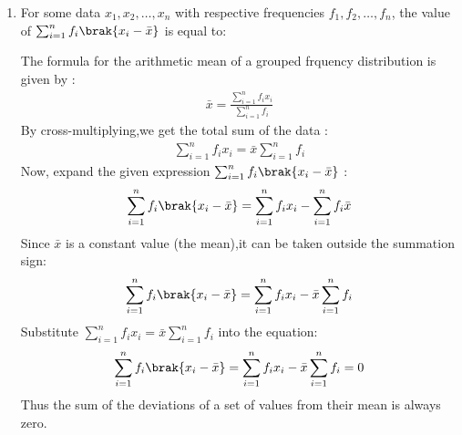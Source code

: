 \begin{enumerate}[label=\thesubsection.\arabic*, ref=\thesubsection.\theenumi]
\item
For some data $x_1, x_2, \ldots, x_n$ with respective frequencies
$f_1, f_2, \ldots, f_n$, the value of $\sum_{i=1}^{n} f_i \brak{x_i - \bar{x}}$ is equal to:
\begin{enumerate}
\end{enumerate}
 \solution
 The formula for the arithmetic mean of a grouped frquency distribution is given by :
 \begin{align} \bar{x} = \frac{ \sum_{i=1}^{n} f_ix_i }{ \sum_{i=1}^{n} f_i }
 \end{align}
 By cross-multiplying,we get the total sum of the data :
 \begin{align} \sum_{i=1}^{n} f_ix_i = \bar{x}\sum_{i=1}^{n} f_i 
 \end{align}
 Now, expand the given expression $\sum_{i=1}^{n} f_i \brak{x_i - \bar{x}}$ :
 \begin{align}\sum_{i=1}^{n} f_i \brak{x_i - \bar{x}} = \sum_{i=1}^{n} f_ix_i - \sum_{i=1}^{n} f_i\bar{x} 
 \end{align}
 Since $\bar{x}$ is a constant value (the mean),it can be taken outside the summation sign:
 \begin{align}\sum_{i=1}^{n} f_i \brak{x_i - \bar{x}} = \sum_{i=1}^{n} f_ix_i - \bar{x} \sum_{i=1}^{n} f_i
 \end{align}
 Substitute $ \sum_{i=1}^{n} f_ix_i = \bar{x} \sum_{i=1}^{n}f_i$ into the equation:
  \begin{align}\sum_{i=1}^{n} f_i \brak{x_i - \bar{x}} = \sum_{i=1}^{n} f_ix_i - \bar{x} \sum_{i=1}^{n} f_i = 0
  \end{align}
  Thus the sum of the deviations of a set of values from their mean is always zero.\\


\end{enumerate}
